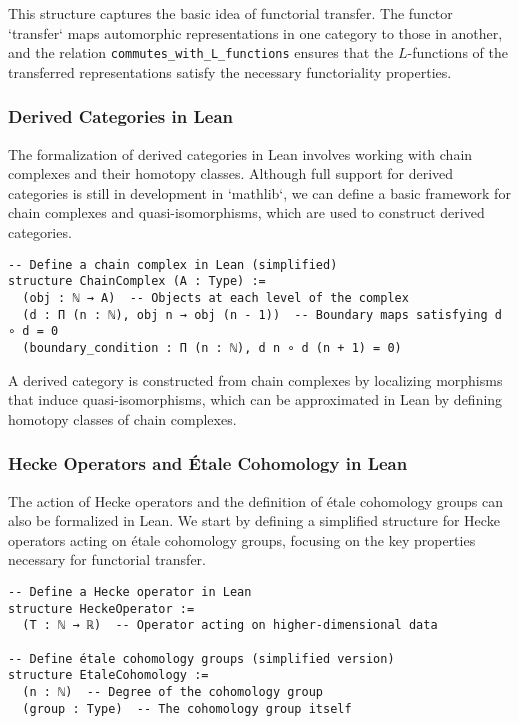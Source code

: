 \documentclass{article}
\theoremstyle{remark}
\begin{document}
This structure captures the basic idea of functorial transfer. The functor `transfer` maps automorphic representations in one category to those in another, and the relation \lstinline{commutes_with_L_functions} ensures that the $L$-functions of the transferred representations satisfy the necessary functoriality properties.

\subsubsection{Derived Categories in Lean}

The formalization of derived categories in Lean involves working with chain complexes and their homotopy classes. Although full support for derived categories is still in development in `mathlib`, we can define a basic framework for chain complexes and quasi-isomorphisms, which are used to construct derived categories.

\begin{lstlisting}
-- Define a chain complex in Lean (simplified)
structure ChainComplex (A : Type) :=
  (obj : ℕ → A)  -- Objects at each level of the complex
  (d : Π (n : ℕ), obj n → obj (n - 1))  -- Boundary maps satisfying d ∘ d = 0
  (boundary_condition : Π (n : ℕ), d n ∘ d (n + 1) = 0)
\end{lstlisting}

A derived category is constructed from chain complexes by localizing morphisms that induce quasi-isomorphisms, which can be approximated in Lean by defining homotopy classes of chain complexes.

\subsubsection{Hecke Operators and Étale Cohomology in Lean}

The action of Hecke operators and the definition of étale cohomology groups can also be formalized in Lean. We start by defining a simplified structure for Hecke operators acting on étale cohomology groups, focusing on the key properties necessary for functorial transfer.

\begin{lstlisting}
-- Define a Hecke operator in Lean
structure HeckeOperator :=
  (T : ℕ → ℝ)  -- Operator acting on higher-dimensional data

-- Define étale cohomology groups (simplified version)
structure EtaleCohomology :=
  (n : ℕ)  -- Degree of the cohomology group
  (group : Type)  -- The cohomology group itself
\end{lstlisting}
\end{document}
